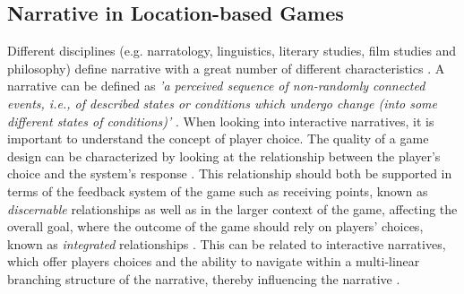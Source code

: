 \subsection{Narrative in Location-based Games}
Different disciplines (e.g. narratology, linguistics, literary studies, film studies and philosophy) define narrative with a great number of different characteristics \cite{Grimaldi}. A narrative can be defined as \emph{'a perceived sequence of non-randomly connected events, i.e., of described states or conditions which undergo change (into some different states of conditions)'} \cite{narrativeDef}. When looking into interactive narratives, it is important to understand the concept of player choice. The quality of a game design can be characterized by looking at the relationship between the player’s choice and the system’s response \cite{RulesofPlay}. This relationship should both be supported in terms of the feedback system of the game such as receiving points, known as \textit{discernable} relationships as well as in the larger context of the game, affecting the overall goal, where the outcome of the game should rely on players' choices, known as \textit{integrated} relationships \cite{RulesofPlay}. This can be related to interactive narratives, which offer players choices and the ability to navigate within a multi-linear branching structure of the narrative, thereby influencing the narrative \cite{ryanavatars}. 


